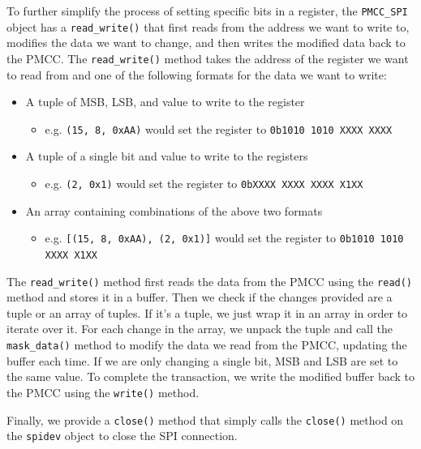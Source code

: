 To further simplify the process of setting specific bits in a register, the \texttt{PMCC\_SPI} object has a \texttt{read\_write()} that first reads from the address we want to write to, modifies the data we want to change, and then writes the modified data back to the PMCC.
The \texttt{read\_write()} method takes the address of the register we want to read from and one of the following formats for the data we want to write:
\begin{itemize}
    \item A tuple of MSB, LSB, and value to write to the register 
    \begin{itemize}
        \item e.g. \texttt{(15, 8, 0xAA)} would set the register to \texttt{0b1010 1010 XXXX XXXX}
    \end{itemize}
    \item A tuple of a single bit and value to write to the registers
    \begin{itemize}
        \item e.g. \texttt{(2, 0x1)} would set the register to \texttt{0bXXXX XXXX XXXX X1XX}
    \end{itemize}
    \item An array containing combinations of the above two formats
    \begin{itemize}
        \item e.g. \texttt{[(15, 8, 0xAA), (2, 0x1)]} would set the register to \texttt{0b1010 1010 XXXX X1XX}
    \end{itemize}
\end{itemize}
The \texttt{read\_write()} method first reads the data from the PMCC using the \texttt{read()} method and stores it in a buffer.
Then we check if the changes provided are a tuple or an array of tuples.
If it's a tuple, we just wrap it in an array in order to iterate over it.
For each change in the array, we unpack the tuple and call the \texttt{mask\_data()} method to modify the data we read from the PMCC, updating the buffer each time.
If we are only changing a single bit, MSB and LSB are set to the same value.
To complete the transaction, we write the modified buffer back to the PMCC using the \texttt{write()} method.


Finally, we provide a \texttt{close()} method that simply calls the \texttt{close()} method on the \texttt{spidev} object to close the SPI connection.

